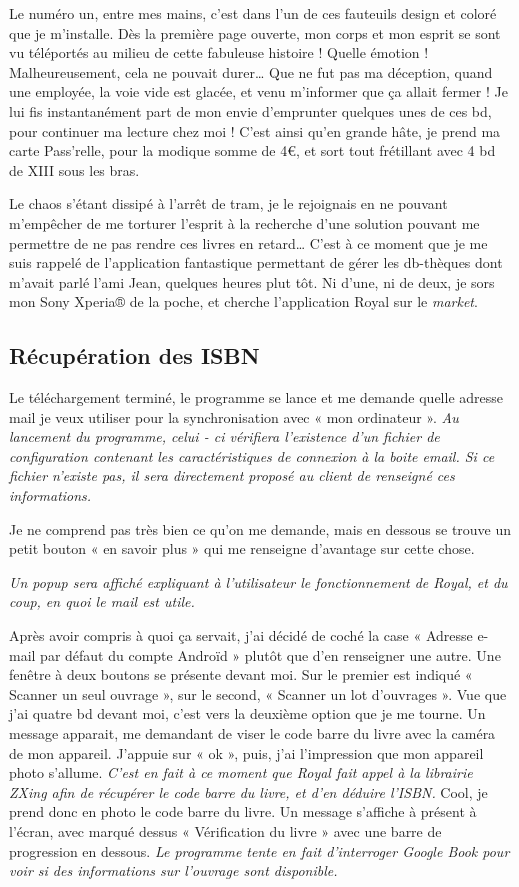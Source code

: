 Le numéro un, entre mes mains, c'est dans l'un de ces fauteuils design et coloré que je m'installe. 
Dès la première page ouverte, mon corps et mon esprit se sont vu téléportés au milieu de cette fabuleuse histoire !
Quelle émotion !
Malheureusement, cela ne pouvait durer… Que ne fut pas ma déception, quand une employée, la voie vide est glacée, et venu m'informer que ça allait fermer !
Je lui fis instantanément part de mon envie d'emprunter quelques unes de ces bd, pour continuer ma lecture chez moi !
C'est ainsi qu'en grande hâte, je prend ma carte Pass'relle, pour la modique somme de 4\euro{}, et sort tout frétillant avec 4 bd de XIII sous les bras. 

Le chaos s'étant dissipé à l'arrêt de tram, je le rejoignais en ne pouvant m'empêcher de me torturer l'esprit à la recherche d'une solution pouvant me permettre de ne pas rendre ces livres en retard…
C'est à ce moment que je me suis rappelé de l'application fantastique permettant de gérer les db-thèques dont m'avait parlé l'ami Jean, quelques heures plut tôt.
Ni d'une, ni de deux, je sors mon Sony Xperia® de la poche, et cherche l'application Royal sur le \emph{market}. 

\subsection{Récupération des ISBN}

Le téléchargement terminé, le programme se lance et me demande quelle adresse mail je veux utiliser pour la synchronisation avec « mon ordinateur ».
\emph{Au lancement du programme, celui - ci vérifiera l'existence d'un fichier de configuration contenant les caractéristiques de connexion à la boite email.
	Si ce fichier n'existe pas, il sera directement proposé au client de renseigné ces informations.}

Je ne comprend pas très bien ce qu'on me demande, mais en dessous se trouve un petit bouton « en savoir plus » qui me renseigne d'avantage sur cette chose.

\emph{Un popup sera affiché expliquant à l'utilisateur le fonctionnement de Royal, et du coup, en quoi le mail est utile.}

Après avoir compris à quoi ça servait, j'ai décidé de coché la case « Adresse e-mail par défaut du compte Androïd » plutôt que d'en renseigner une autre. 
Une fenêtre à deux boutons se présente devant moi.
Sur le premier est indiqué « Scanner un seul ouvrage », sur le second, « Scanner un lot d'ouvrages ». 
Vue que j'ai quatre bd devant moi, c'est vers la deuxième option que je me tourne. 
Un message apparait, me demandant de viser le code barre du livre avec la caméra de mon appareil. J'appuie sur « ok », puis, j'ai l'impression que mon appareil photo s'allume. 
\emph{C'est en fait à ce moment que Royal fait appel à la librairie ZXing afin de récupérer le code barre du livre, et d'en déduire l'ISBN.} 
Cool, je prend donc en photo le code barre du livre.
Un message s'affiche à présent à l'écran, avec marqué dessus « Vérification du livre » avec une barre de progression en dessous.
\emph{Le programme tente en fait d'interroger Google Book pour voir si des informations sur l'ouvrage sont disponible.}

